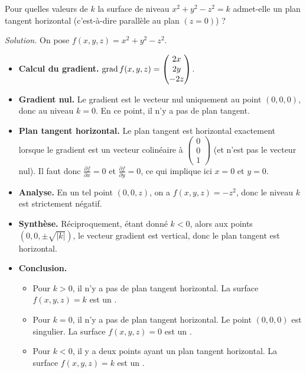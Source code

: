 \documentclass[11pt, class=report,crop=false]{standalone}
\begin{document}
\begin{exemple}
Pour quelles valeurs de $k$ la surface de niveau $x^2+y^2-z^2=k$ admet-elle un plan tangent horizontal (c'est-à-dire parallèle au plan $(z=0)$) ?

\emph{Solution.}
On pose $f(x,y,z) = x^2+y^2-z^2$.
\begin{itemize}
  \item \textbf{Calcul du gradient.}   
  $\operatorname{grad} f (x,y,z) = \begin{pmatrix}2x\\2y\\-2z\end{pmatrix}$.
  
  \item \textbf{Gradient nul.} Le gradient est le vecteur nul uniquement au point $(0,0,0)$, donc au niveau $k=0$. En ce point, il n'y a pas de plan tangent.
  
  \item \textbf{Plan tangent horizontal.}  
  Le plan tangent est horizontal exactement lorsque le gradient est un vecteur colinéaire à $\left(\begin{smallmatrix}0\\0\\1\end{smallmatrix}\right)$ (et n'est pas le vecteur nul).
  Il faut donc $\frac{\partial f}{\partial x} = 0$ et $\frac{\partial f}{\partial y} = 0$, ce qui implique ici $x=0$ et $y=0$.
  
  \item \textbf{Analyse.}
  En un tel point $(0,0,z)$, on a $f(x,y,z)=-z^2$, donc le niveau $k$ est strictement négatif.
  
  \item \textbf{Synthèse.} Réciproquement, étant donné $k<0$, alors aux points $(0,0,\pm\sqrt{|k|})$, le vecteur gradient est vertical, donc le plan tangent est horizontal.
  
  \item \textbf{Conclusion.}
  \begin{itemize} 
    \item Pour $k>0$, il n'y a pas de plan tangent horizontal. La surface $f(x,y,z)=k$ est un . 
    
    \item Pour $k=0$, il n'y a pas de plan tangent horizontal. Le point $(0,0,0)$ est singulier. La surface $f(x,y,z)=0$ est un . 
    
    \item Pour $k<0$, il y a deux points ayant un plan tangent horizontal. La surface $f(x,y,z)=k$ est un .   
    

\end{itemize}
\end{itemize}
\end{exemple}
\end{document}
